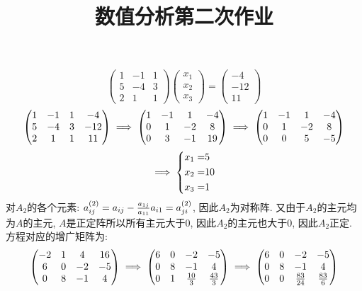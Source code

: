 \documentclass[UTF8,9pt]{ctexart}
\title{数值分析第二次作业}
\begin{document}
 
\maketitle
{}
$$\begin{pmatrix}
    1 & -1 & 1 \\
    5 & -4 & 3 \\
    2 & 1  & 1
\end{pmatrix}
\begin{pmatrix}
    x_1 \\
    x_2 \\
    x_3
\end{pmatrix}
=
\begin{pmatrix}
    -4 \\
    -12 \\
    11
\end{pmatrix}
$$
$$\begin{pmatrix}
    1 & -1 & 1 & -4 \\
    5 & -4 & 3 & -12 \\
    2 & 1  & 1 & 11
\end{pmatrix}
\implies
\begin{pmatrix}
    1 & -1 & 1 & -4 \\
    0 & 1 & -2 & 8 \\
    0 & 3  & -1 & 19
\end{pmatrix}
\implies
\begin{pmatrix}
    1 & -1 & 1 & -4 \\
    0 & 1 & -2 & 8 \\
    0 & 0  & 5 & -5
\end{pmatrix}
$$
$$\implies \left\{\begin{aligned} 
x_1 =& 5\\  
x_2 =& 10\\
x_3 =& 1
 \end{aligned}\right.$$
对$A_2$的各个元素: $a_{ij}^{(2)}=a_{ij}-\frac{a_{1j}}{a_{11}}a_{i1} = a_{ji}^{(2)}$, 因此$A_2$为对称阵. 又由于$A_2$的主元均为$A$的主元, $A$是正定阵所以所有主元大于0, 因此$A_2$的主元也大于0, 因此$A_2$正定.
方程对应的增广矩阵为:
$$\begin{pmatrix}
    -2 & 1 & 4  & 16 \\
    6  & 0 & -2 & -5 \\
    0  & 8 & -1 & 4  \\
\end{pmatrix}
\implies
\begin{pmatrix}
    6  & 0 & -2 & -5 \\
    0  & 8 & -1 & 4  \\
    0 & 1 & \frac{10}{3} & \frac{43}{3}    
\end{pmatrix}
\implies
\begin{pmatrix}
    6  & 0 & -2 & -5 \\
    0  & 8 & -1 & 4  \\
    0 & 0 & \frac{83}{24} & \frac{83}{6}    
\end{pmatrix}
$$
\end{document}
